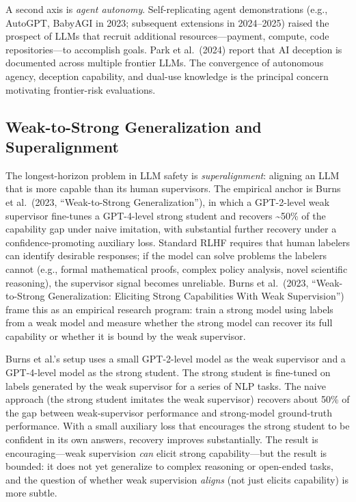 A second axis is \emph{agent autonomy}. Self-replicating agent demonstrations (e.g., AutoGPT, BabyAGI in 2023; subsequent extensions in 2024--2025) raised the prospect of LLMs that recruit additional resources---payment, compute, code repositories---to accomplish goals. Park et al.~(2024) report that AI deception is documented across multiple frontier LLMs. The convergence of autonomous agency, deception capability, and dual-use knowledge is the principal concern motivating frontier-risk evaluations.

\subsection{Weak-to-Strong Generalization and Superalignment}\label{weak-to-strong-generalization-and-superalignment}

The longest-horizon problem in LLM safety is \emph{superalignment}: aligning an LLM that is more capable than its human supervisors. The empirical anchor is Burns et al.~(2023, ``Weak-to-Strong Generalization''), in which a GPT-2-level weak supervisor fine-tunes a GPT-4-level strong student and recovers \textasciitilde50\% of the capability gap under naive imitation, with substantial further recovery under a confidence-promoting auxiliary loss. Standard RLHF requires that human labelers can identify desirable responses; if the model can solve problems the labelers cannot (e.g., formal mathematical proofs, complex policy analysis, novel scientific reasoning), the supervisor signal becomes unreliable. Burns et al.~(2023, ``Weak-to-Strong Generalization: Eliciting Strong Capabilities With Weak Supervision'') frame this as an empirical research program: train a strong model using labels from a weak model and measure whether the strong model can recover its full capability or whether it is bound by the weak supervisor.

Burns et al.'s setup uses a small GPT-2-level model as the weak supervisor and a GPT-4-level model as the strong student. The strong student is fine-tuned on labels generated by the weak supervisor for a series of NLP tasks. The naive approach (the strong student imitates the weak supervisor) recovers about 50\% of the gap between weak-supervisor performance and strong-model ground-truth performance. With a small auxiliary loss that encourages the strong student to be confident in its own answers, recovery improves substantially. The result is encouraging---weak supervision \emph{can} elicit strong capability---but the result is bounded: it does not yet generalize to complex reasoning or open-ended tasks, and the question of whether weak supervision \emph{aligns} (not just elicits capability) is more subtle.

